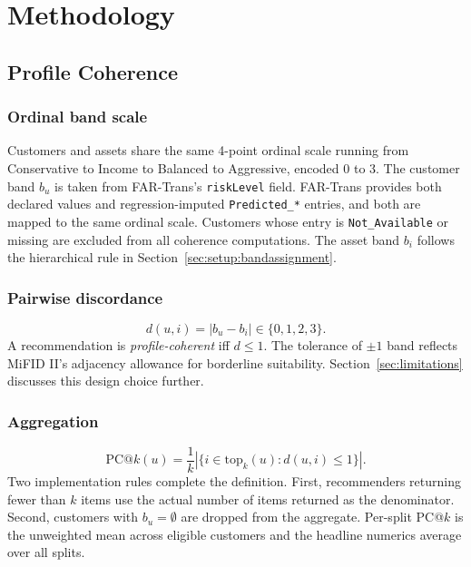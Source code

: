 \section{Methodology}
\label{sec:method}

\subsection{Profile Coherence}
\label{sec:method:pck}

\subsubsection{Ordinal band scale}
Customers and assets share the same 4-point ordinal scale running from Conservative to Income to Balanced to Aggressive, encoded 0 to 3. The customer band $b_u$ is taken from FAR-Trans's \texttt{riskLevel} field. FAR-Trans provides both declared values and regression-imputed \texttt{Predicted\_*} entries, and both are mapped to the same ordinal scale. Customers whose entry is \texttt{Not\_Available} or missing are excluded from all coherence computations. The asset band $b_i$ follows the hierarchical rule in Section~\ref{sec:setup:bandassignment}.

\subsubsection{Pairwise discordance}
\begin{equation}
d(u, i) = |b_u - b_i| \in \{0, 1, 2, 3\}.
\end{equation}
A recommendation is \emph{profile-coherent} iff $d \leq 1$. The tolerance of $\pm 1$ band reflects MiFID II's adjacency allowance for borderline suitability. Section~\ref{sec:limitations} discusses this design choice further.

\subsubsection{Aggregation}
\begin{equation}
\text{PC@}k(u) = \frac{1}{k} \left|\{ i \in \text{top}_k(u) : d(u, i) \leq 1 \}\right|.
\end{equation}
Two implementation rules complete the definition. First, recommenders returning fewer than $k$ items use the actual number of items returned as the denominator. Second, customers with $b_u = \emptyset$ are dropped from the aggregate. Per-split PC@$k$ is the unweighted mean across eligible customers and the headline numerics average over all splits.

